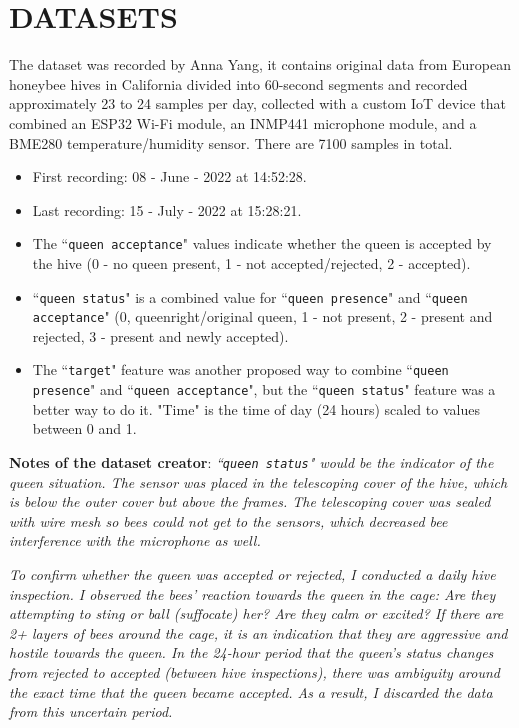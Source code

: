 \documentclass[12pt]{report}
\begin{document}
\section{DATASETS}

\par The dataset\cite{AnnaYang-Dataset} was recorded by Anna Yang, it contains original data from European honeybee hives in California divided into 60-second segments and recorded approximately 23 to 24 samples per day, collected with a custom IoT device that combined an ESP32 Wi-Fi module, an INMP441 microphone module, and a BME280 temperature/humidity sensor. There are 7100 samples in total.
        
    \begin{itemize}
        \item First recording: 08 - June - 2022 at 14:52:28.
        \item Last recording: 15 - July - 2022 at 15:28:21.
        \item The ``{\tt queen acceptance}" values indicate whether the queen is accepted by the hive (0 - no queen present, 1 - not accepted/rejected, 2 - accepted).
        \item ``{\tt queen status}" is a combined value for ``{\tt queen presence}" and ``{\tt queen acceptance}" (0, queenright/original queen, 1 - not present, 2 - present and rejected, 3 - present and newly accepted).
        \item  The ``{\tt target}" feature was another proposed way to combine ``{\tt queen presence}" and ``{\tt queen acceptance}", but the ``{\tt queen status}" feature was a better way to do it. "Time" is the time of day (24 hours) scaled to values between 0 and 1.
    \end{itemize}

\par\textbf{Notes of the dataset creator}: \textit{``{\tt queen status}" would be the indicator of the queen situation. The sensor was placed in the telescoping cover of the hive, which is below the outer cover but above the frames. The telescoping cover was sealed with wire mesh so bees could not get to the sensors, which decreased bee interference with the microphone as well.}

\par\textit{To confirm whether the queen was accepted or rejected, I conducted a daily hive inspection. I observed the bees’ reaction towards the queen in the cage: Are they attempting to sting or ball (suffocate) her? Are they calm or excited? If there are 2+ layers of bees around the cage, it is an indication that they are aggressive and hostile towards the queen. In the 24-hour period that the queen’s status changes from rejected to accepted (between hive inspections), there was ambiguity around the exact time that the queen became accepted. As a result, I discarded the data from this uncertain period.}
\end{document}
